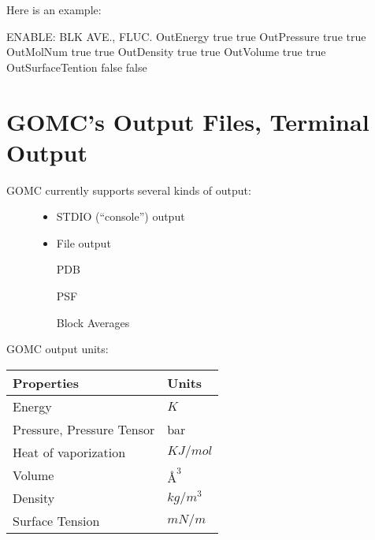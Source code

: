 \documentclass[letterpaper,10pt,english]{sphinxmanual}
\begin{document}
\begin{description}
Here is an example:

%
\begin{sphinxVerbatim}[commandchars=\\\{\}]
\PYGZsh{}\PYGZsh{}\PYGZsh{}\PYGZsh{}\PYGZsh{}\PYGZsh{}\PYGZsh{}\PYGZsh{}\PYGZsh{}\PYGZsh{}\PYGZsh{}\PYGZsh{}\PYGZsh{}\PYGZsh{}\PYGZsh{}\PYGZsh{}\PYGZsh{}\PYGZsh{}\PYGZsh{}\PYGZsh{}\PYGZsh{}\PYGZsh{}\PYGZsh{}\PYGZsh{}\PYGZsh{}\PYGZsh{}\PYGZsh{}\PYGZsh{}\PYGZsh{}\PYGZsh{}\PYGZsh{}\PYGZsh{}\PYGZsh{}
\PYGZsh{} ENABLE: BLK AVE., FLUC.
\PYGZsh{}\PYGZsh{}\PYGZsh{}\PYGZsh{}\PYGZsh{}\PYGZsh{}\PYGZsh{}\PYGZsh{}\PYGZsh{}\PYGZsh{}\PYGZsh{}\PYGZsh{}\PYGZsh{}\PYGZsh{}\PYGZsh{}\PYGZsh{}\PYGZsh{}\PYGZsh{}\PYGZsh{}\PYGZsh{}\PYGZsh{}\PYGZsh{}\PYGZsh{}\PYGZsh{}\PYGZsh{}\PYGZsh{}\PYGZsh{}\PYGZsh{}\PYGZsh{}\PYGZsh{}\PYGZsh{}\PYGZsh{}\PYGZsh{}
OutEnergy         true true
OutPressure       true true
OutMolNum         true true
OutDensity        true true
OutVolume         true true
OutSurfaceTention false false
\end{sphinxVerbatim}

\end{description}


\chapter{GOMC’s Output Files, Terminal Output}
\label{\detokenize{output_file:gomc-s-output-files-terminal-output}}\label{\detokenize{output_file::doc}}\begin{description}
\item[{GOMC currently supports several kinds of output:}] \leavevmode\begin{itemize}
\item {} 
STDIO (“console”) output

\item {} 
File output

\textendash{} PDB

\textendash{} PSF

\textendash{} Block Averages

\end{itemize}

\end{description}

GOMC output units:


\begin{savenotes}\sphinxattablestart
\centering
\begin{tabulary}{\linewidth}[t]{|T|T|}
\hline
\sphinxstyletheadfamily 
Properties
&\sphinxstyletheadfamily 
Units
\\
\hline
Energy
&
\(K\)
\\
\hline
Pressure, Pressure Tensor
&
bar
\\
\hline
Heat of vaporization
&
\(KJ/mol\)
\\
\hline
Volume
&
\(Å^3\)
\\
\hline
Density
&
\(kg/m^3\)
\\
\hline
Surface Tension
&
\(mN/m\)
\\
\hline
\end{tabulary}
\par
\sphinxattableend\end{savenotes}
\end{document}
